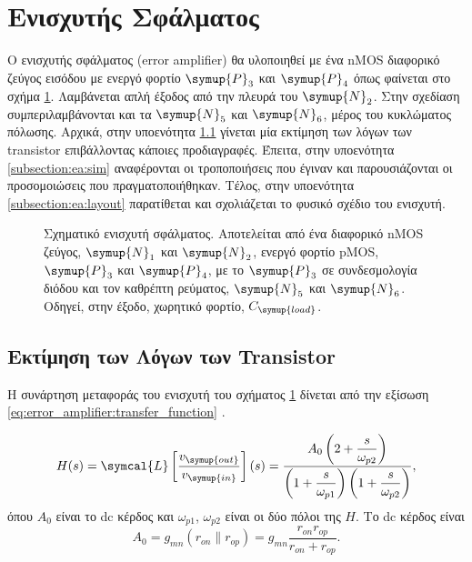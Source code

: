 \section{Ενισχυτής Σφάλματος}\label{section:EA}

Ο ενισχυτής σφάλματος (error amplifier) θα υλοποιηθεί με ένα nMOS διαφορικό ζεύγος εισόδου με ενεργό φορτίο $\symup{P}_3$ και $\symup{P}_4$ όπως φαίνεται στο σχήμα \ref{fig:error_amplifier:schematic}. Λαμβάνεται απλή έξοδος από την πλευρά του $\symup{N}_2$. Στην σχεδίαση συμπεριλαμβάνονται και τα $\symup{N}_5$ και $\symup{N}_6$, μέρος του κυκλώματος πόλωσης. Αρχικά, στην υποενότητα \ref{subsection:ea:ratios} γίνεται μία εκτίμηση των λόγων των transistor επιβάλλοντας κάποιες προδιαγραφές. Έπειτα, στην υποενότητα \ref{subsection:ea:sim} αναφέρονται οι τροποποιήσεις που έγιναν και παρουσιάζονται οι προσομοιώσεις που πραγματοποιήθηκαν. Τέλος, στην υποενότητα \ref{subsection:ea:layout} παρατίθεται και σχολιάζεται το φυσικό σχέδιο του ενισχυτή.

\begin{figure}[h!]
	\centering
	
	\caption{Σχηματικό ενισχυτή σφάλματος. Αποτελείται από ένα διαφορικό nMOS ζεύγος, $\symup{N}_1$ και $\symup{N}_2$, ενεργό φορτίο pMOS, $\symup{P}_3$ και $\symup{P}_4$, με το $\symup{P}_3$ σε συνδεσμολογία διόδου και τον καθρέπτη ρεύματος, $\symup{N}_5$ και $\symup{N}_6$. Οδηγεί, στην έξοδο, χωρητικό φορτίο, $C_{\symup{load}}$.}
	\label{fig:error_amplifier:schematic}
\end{figure}

\subsection{Εκτίμηση των Λόγων των Transistor}\label{subsection:ea:ratios}

Η συνάρτηση μεταφοράς του ενισχυτή του σχήματος \ref{fig:error_amplifier:schematic} δίνεται από την εξίσωση \eqref{eq:error_amplifier:transfer_function} \cite{RazaviCMOS}.

\begin{equation}
	\label{eq:error_amplifier:transfer_function}
	H(s)=\symcal{L}\left[\frac{v_{\symup{out}}}{v_{\symup{in}}}\right](s)=\frac{A_0 \left( 2 + \displaystyle\frac{s}{\omega_{p2}} \right)}{\left( 1 + \displaystyle\frac{s}{\omega_{p1}} \right) \left( 1 + \displaystyle\frac{s}{\omega_{p2}} \right)},
\end{equation}
όπου $A_0$ είναι το dc κέρδος και $\omega_{p1}$, $\omega_{p2}$ είναι οι δύο πόλοι της $H$. Το dc κέρδος είναι \cite{RazaviCMOS}
\begin{equation*}
	A_0=g_{mn}\left(r_{on}\parallel r_{op}\right)=g_{mn}\frac{r_{on} r_{op}}{r_{on}+r_{op}}.
\end{equation*}

